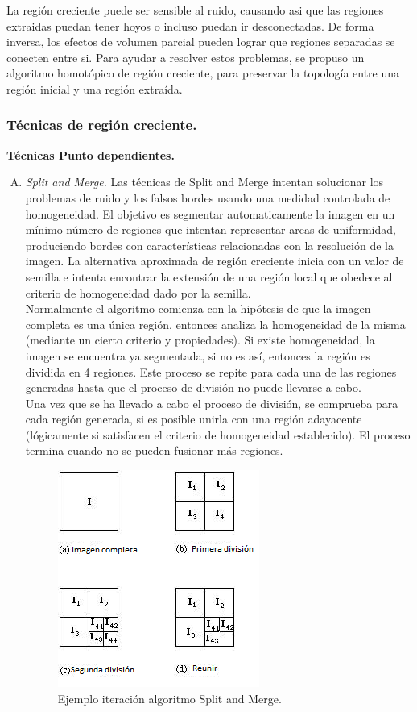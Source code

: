 \documentclass[12pt]{report}
\begin{document}
La región creciente puede ser sensible al ruido, causando asi que las regiones extraidas puedan tener hoyos o incluso puedan ir desconectadas. De forma inversa, los efectos de volumen parcial pueden lograr que regiones separadas se conecten entre si. Para ayudar a resolver estos problemas, se propuso un algoritmo homotópico de región creciente, para preservar la topología entre una región inicial y una región extraída.

\subsubsection{Técnicas de región creciente.}
\textbf{ Técnicas Punto dependientes.}
\begin{enumerate}[A.]
\item \textit{Split and Merge.}
Las técnicas de Split and Merge intentan solucionar los problemas de ruido y los falsos bordes usando una medidad controlada de homogeneidad.
El objetivo es segmentar automaticamente la imagen en un mínimo número de regiones que intentan representar areas de uniformidad, produciendo bordes con características relacionadas con la resolución de la imagen. La alternativa aproximada de región creciente inicia con un valor de semilla e intenta encontrar la extensión de una región local que obedece al criterio de homogeneidad dado por la semilla.\\
Normalmente el algoritmo comienza con la hipótesis de que la imagen completa es una única región, entonces analiza la homogeneidad de la misma (mediante un cierto criterio y propiedades). Si existe homogeneidad, la imagen se encuentra ya segmentada, si no es así, entonces la región es dividida en 4 regiones.
Este proceso se repite para cada una de las regiones generadas hasta que el proceso de división no puede llevarse a cabo.\\
Una vez que se ha llevado a cabo el proceso de división, se comprueba para cada región generada, si es posible unirla con una región adayacente (lógicamente si satisfacen el criterio de homogeneidad establecido). El proceso termina cuando no se pueden fusionar más regiones.\cite{split}

\begin{figure}[H]
\centering
\includegraphics[width = 7 cm, height = 7 cm]{split}
\caption{Ejemplo iteración algoritmo Split and Merge.}
\end{figure}
\end{enumerate}
\end{document}
